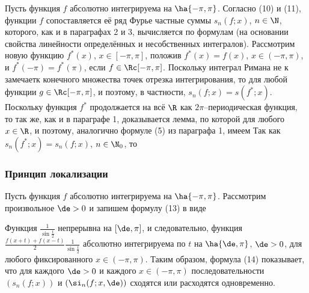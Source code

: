 \documentclass[a4paper]{article}
\begin{document}
Пусть функция $f$ абсолютно интегрируема на $\ha{-\pi,\pi}$.
Согласно (10) и (11), функции $f$ сопоставляется её ряд Фурье  частные суммы $s_n(f;x)$, $n\in\N$,
которого, как и в параграфах 2 и 3, вычисляется по формулам
(на основании свойства линейности определённых и несобственных
интегралов). Рассмотрим новую функцию $f^*(x)$, $x\in[-\pi,\pi]$,
положив $f^*(x)=f(x)$, $x\in(-\pi,\pi)$, и $f^*(-\pi) = f^*(\pi)$,
если $f\in\Rc[-\pi,\pi]$. Поскольку интеграл Римана не к
замечаетк конечного множества точек отрезка интегрирования, то
 для любой функции $g\in\Rc[-\pi,\pi]$, и поэтому, в
частности, $s_n(f;x) = s(f^*;x)$. Поскольку функция $f^*$
продолжается на всё $\R$ как $2\pi$--периодическая функция, то так
же, как и в параграфе 1, доказывается лемма, по которой
 для любого $x\in\R$, и поэтому, аналогично формуле (5)
из параграфа 1, имеем  Так как
$s_n(f^*;x) = s_n(f;x)$, $n\in\N_0$, то 

\subsubsection{Принцип локализации}

Пусть функция $f$ абсолютно интегрируема на $\ha{-\pi,\pi}$.
Рассмотрим произвольное $\de>0$ и запишем формулу (13) в виде

Функция $\frac1{\sin\frac{t}2}$ непрерывна на $[\de,\pi]$, и
следовательно, функция $\frac{f(x+t) + f(x-t)}2
\frac1{\sin\frac{t}2}$ абсолютно интегрируема по $t$ на
$\ha{\de,\pi}$, $\de>0$, для любого фиксированного $x\in(-\pi,\pi)$.
Таким образом, формула (14) показывает, что для каждого $\de>0$ и
каждого $x\in(-\pi,\pi)$ последовательности $(s_n(f;x))$ и
$(\si_n(f;x,\de))$ сходятся или расходятся одновременно.
\end{document}
